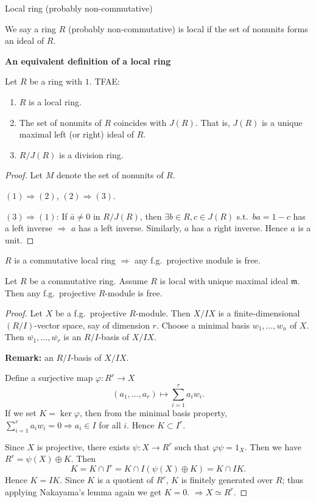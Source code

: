 \documentclass[11pt, a4paper]{report}
\begin{document}
\begin{definition}
Local ring (probably non-commutative)

We say a ring $R$ (probably non-commutative) is local if the set of nonunits forms an ideal of $R$.

\textbf{An equivalent definition of a local ring}

Let $R$ be a ring with $1$. TFAE:
\begin{enumerate}
\item $R$ is a local ring.
\item The set of nonunits of $R$ coincides with $J(R)$. That is, $J(R)$ is a unique maximal left (or right) ideal of $R$.
\item $R / J(R)$ is a division ring.
\end{enumerate}
\end{definition}

\begin{proof}
Let $M$ denote the set of nonunits of $R$.

$(1) \Rightarrow (2)$, $(2) \Rightarrow (3)$.

$(3) \Rightarrow (1)$: If $\bar{a} \neq 0$ in $R / J(R)$, then $\exists b \in R, c \in J(R)$ s.t.\ $ba = 1 - c$ has a left inverse $\Rightarrow$ $a$ has a left inverse. Similarly, $a$ has a right inverse. Hence $a$ is a unit.
\end{proof}

\begin{proposition}
$R$ is a commutative local ring $\Rightarrow$ any f.g.\ projective module is free.

Let $R$ be a commutative ring. Assume $R$ is local with unique maximal ideal $\mathfrak{m}$. Then any f.g.\ projective $R$-module is free.
\end{proposition}

\begin{proof}
Let $X$ be a f.g.\ projective $R$-module.
Then $X/IX$ is a finite-dimensional $(R/I)$-vector space, say of dimension $r$. Choose a minimal basis $w_{1}, \ldots, w_{n}$ of $X$. Then $\overline{w_{1}}, \ldots, \overline{w_{r}}$ is an $R/I$-basis of $X/IX$.

\textbf{Remark:} an $R/I$-basis of $X/IX$.

Define a surjective map $\varphi: R^{r} \rightarrow X$
\[
\left(a_{1}, \ldots, a_{r}\right) \mapsto \sum_{i=1}^{r} a_{i} w_{i}.
\]
If we set $K = \ker \varphi$, then from the minimal basis property, $\sum_{i=1}^{r} a_{i} w_{i}=0 \Rightarrow a_{i} \in I$ for all $i$. Hence $K \subset I^{r}$.

Since $X$ is projective, there exists $\psi: X \rightarrow R^{r}$ such that $\varphi \psi = 1_{X}$. Then we have $R^{r} = \psi(X) \oplus K$. Then
\[
K = K \cap I^{r} = K \cap I(\psi(X) \oplus K) = K \cap IK.
\]
Hence $K = IK$. Since $K$ is a quotient of $R^{r}$, $K$ is finitely generated over $R$; thus applying Nakayama's lemma again we get $K = 0$. $\Rightarrow X \simeq R^{r}$.

\end{proof}
\end{document}
